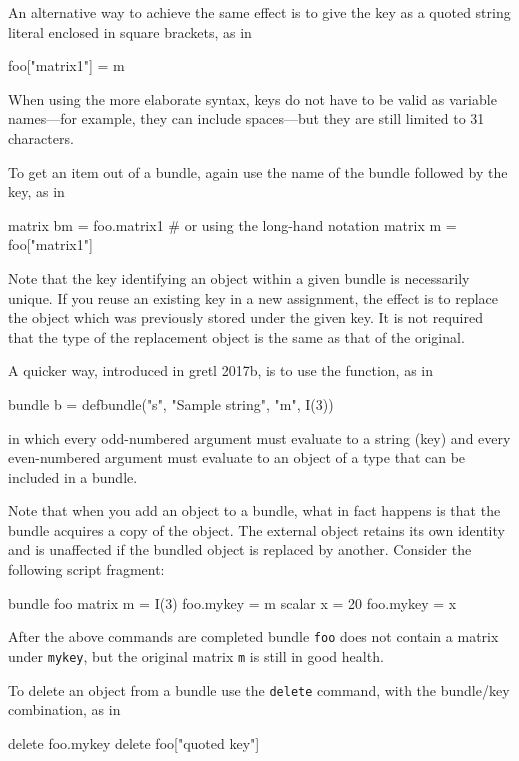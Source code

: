 An alternative way to achieve the same effect is to give the key as a
quoted string literal enclosed in square brackets, as in
\begin{code}
  foo["matrix1"] = m
\end{code}
When using the more elaborate syntax, keys do not have to be valid as
variable names---for example, they can include spaces---but they are
still limited to 31 characters.

To get an item out of a bundle, again use the name of the bundle
followed by the key, as in

\begin{code}
matrix bm = foo.matrix1
# or using the long-hand notation
matrix m = foo["matrix1"]
\end{code}

Note that the key identifying an object within a given bundle is
necessarily unique. If you reuse an existing key in a new assignment,
the effect is to replace the object which was previously stored under
the given key. It is not required that the type of the replacement
object is the same as that of the original.

A quicker way, introduced in gretl 2017b, is to use the
 function, as in
\begin{code}
  bundle b = defbundle("s", "Sample string", "m", I(3))
\end{code}
in which every odd-numbered argument must evaluate to a string (key)
and every even-numbered argument must evaluate to an object of a type
that can be included in a bundle.

Note that when you add an object to a bundle, what in fact happens is
that the bundle acquires a copy of the object. The external object
retains its own identity and is unaffected if the bundled object is
replaced by another. Consider the following script fragment:

\begin{code}
bundle foo
matrix m = I(3)
foo.mykey = m
scalar x = 20
foo.mykey = x
\end{code}

After the above commands are completed bundle \texttt{foo} does not
contain a matrix under \texttt{mykey}, but the original matrix
\texttt{m} is still in good health.

To delete an object from a bundle use the \texttt{delete} command,
with the bundle/key combination, as in

\begin{code}
delete foo.mykey
delete foo["quoted key"]
\end{code}

